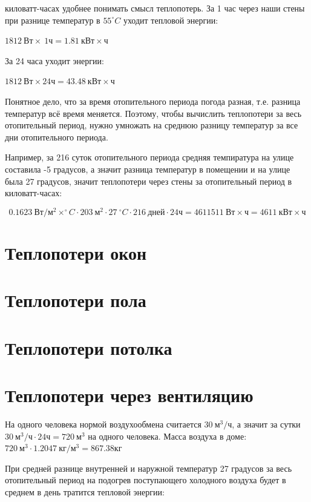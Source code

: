 \documentclass[10pt, twocolumn]{report}
\begin{document}
 киловатт-часах удобнее понимать смысл теплопотерь. За 1 час через наши стены при разнице температур в $55^{\circ}C$ уходит тепловой энергии:

$1812\ \text{Вт} \times\ 1 \text{ч} = 1.81\ \text{кВт} \times \text{ч}$

За 24 часа уходит энергии:

$1812\ \text{Вт} \times 24 \text{ч} = 43.48\ \text{кВт} \times \text{ч} $

Понятное дело, что за время отопительного периода погода разная, т.е. разница температур всё время меняется. Поэтому, чтобы вычислить теплопотери за весь отопительный период, нужно умножать на среднюю разницу температур за все дни отопительного периода.

Например, за 216 суток отопительного периода средняя темпиратура на улице составила -5 градусов, а значит разница температур в помещении и на улице была 27 градусов, значит теплопотери через стены за отопительный период в киловатт-часах:

$$ 0.1623\ \text{Вт} / \text{м}^2\times^{\circ}C \cdot 203\ \text{м}^2 \cdot 27\ ^{\circ}C \cdot 216\ \text{дней} \cdot 24 \text{ч} = 4611511\ \text{Вт}\times\text{ч} = 4611\ \text{кВт}\times\text{ч} $$


\section{Теплопотери окон}

\section{Теплопотери пола}

\section{Теплопотери потолка}

\section{Теплопотери через вентиляцию}

На одного человека нормой воздухообмена считается $30\ \text{м}^3 / \text{ч}$, а значит за сутки $30\ \text{м}^3 / \text{ч} \cdot 24 \text{ч} = 720\ \text{м}^3$ на одного человека. Масса воздуха в доме: $ 720\ \text{м}^3 \cdot 1.2047\ \text{кг}/\text{м}^3 = 867.38 \text{кг} $

При средней разнице внутренней и наружной температур 27 градусов за весь отопительный период на подогрев поступающего холодного воздуха будет в среднем в день тратится тепловой энергии:
\end{document}
